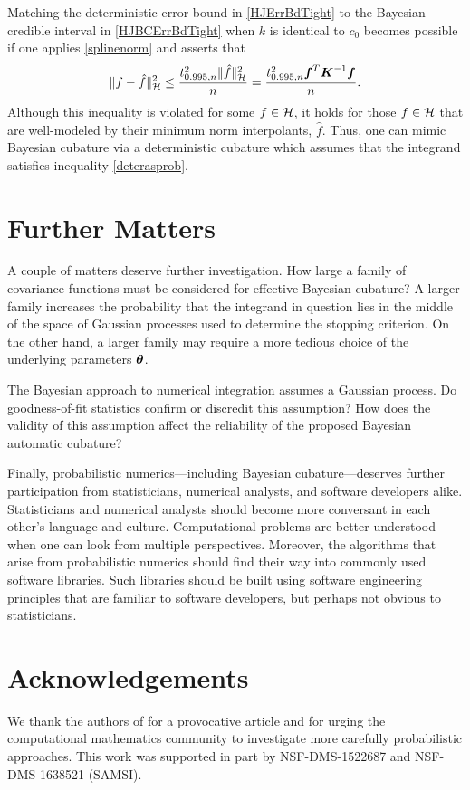 \documentclass[sts]{imsart}
\numberwithin{equation}{section}
\theoremstyle{plain}
\newcommand{\calH}{\mathcal{H}}
\newcommand{\BOGOS}{\citetalias{BriEtal18a}}%
\begin{document}
Matching the deterministic error bound in \eqref{HJErrBdTight} to the Bayesian credible interval in  \eqref{HJBCErrBdTight} when  $k$ is identical to $c_0$ becomes possible if one applies \eqref{splinenorm} and asserts that 
\begin{equation}
\label{deterasprob}
\lVert f - \hat{f} \rVert_{\calH}^2 \le \frac{ t_{0.995,n}^2 \lVert \hat{f} \rVert^2_{\calH}}{n} = \frac{t_{0.995,n}^2 \vf^T \vK^{-1} \vf}{n}.
\end{equation}
Although this inequality is violated for some $f \in \mathcal{H}$, it holds for those $f \in \mathcal{H}$ that are well-modeled by their minimum norm interpolants, $\hat{f}$.  Thus, one can mimic Bayesian cubature via a deterministic cubature which assumes that the integrand satisfies inequality \eqref{deterasprob}.


\section{Further Matters}

A couple of matters deserve further investigation.  How large a family of covariance functions must be considered for effective Bayesian cubature?  A larger family increases the probability that the integrand in question lies in the middle of the space of Gaussian processes used to determine the stopping criterion.  On the other hand, a larger family may require a more tedious choice of the underlying parameters $\boldsymbol{\theta}$.

The Bayesian approach to numerical integration assumes a Gaussian process.  Do goodness-of-fit statistics confirm or discredit this assumption?  How does the validity of this assumption affect the reliability of the proposed Bayesian automatic cubature?

Finally, probabilistic numerics---including Bayesian cubature---deserves further participation from statisticians, numerical analysts, and software developers alike.  Statisticians and numerical analysts should become more conversant in each other's language and culture.  Computational problems are better understood when one can look from multiple perspectives.  Moreover, the algorithms that arise from probabilistic numerics should find their way into commonly used software libraries.  Such libraries should be built using  software engineering principles that are familiar to software developers, but perhaps not obvious to statisticians.




\section*{Acknowledgements}
We thank the authors of \BOGOS{} for a provocative article and for urging the computational mathematics community to investigate more carefully probabilistic approaches.  This work was supported in part by NSF-DMS-1522687 and NSF-DMS-1638521 (SAMSI).



\end{document}
